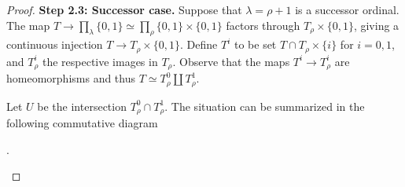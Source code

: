 \begin{proof}
\textbf{Step 2.3: Successor case.}
Suppose that $ \lambda = \rho + 1 $ is a successor ordinal.
The map $ T\to \prod _{\lambda} \{0, 1\}\simeq \prod _{\rho}\{0, 1\} \times \{0, 1\} $
factors through $ T _{\rho} \times \{0, 1\} $, giving a continuous injection $ T\to T _{\rho}\times \{0, 1\} $.
Define $ T ^{i} $ to be set $ T\cap T _{\rho}\times \{i\} $ for $ i = 0, 1 $,
and $ T ^{i}_{\rho} $ the respective images in $ T _{\rho} $.
Observe that the maps $ T ^{i}\to T ^{i}_{\rho} $ are homeomorphisms and thus $ T \simeq T ^{0}_{\rho} \coprod T ^{1}_{\rho} $.

Let $ U $ be the intersection $ T ^{0}_{\rho}\cap T ^{1}_{\rho} $.
The situation can be summarized in the following commutative diagram
\begin{center}
.
\end{center}
%

\end{proof}

